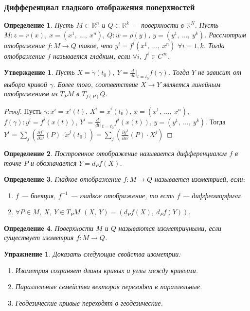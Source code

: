 \documentclass[12pt]{article}
\theoremstyle{plain}
\newtheorem{subtheorem}{Утверждение}[section]
\newtheorem*{exercise}{Упражнение}
\newtheorem{definition}{Определение}[section]
\newcommand{\R}{\mathbb R}
\begin{document}
    \subsubsection{Дифференциал гладкого отображения поверхностей}
    \begin{definition}
        Пусть $M\subset\R^n$ и $Q\subset\R^k$ --- поверхности в $\R^N$. Пусть $M:z=r(x)$, $x=(x^1, \ \ldots, \ x^n)$, $Q:w=\rho(y)$, $y=(y^1, \ \ldots, \ y^k)$. Рассмотрим отображение $f:M\to Q$ такое, что $y^i=f^i(x^1, \ \ldots, \ x^n)$ $\forall i=\overline{1,k}$. Тогда отображение $f$ называется гладким, если $\forall i$, $f^i\in C^{\infty}$.
    \end{definition}
    \begin{subtheorem}
        Пусть $X=\dot{\gamma}(t_0)$, $Y=\frac{d}{dt}|_{t=t_0}f(\gamma)$. Тогда $Y$ не зависит от выбора кривой $\gamma$. Более того, соответствие $X\longrightarrow Y$ является линейным отображением из $T_PM$ в $T_{f(P)}Q$.
    \end{subtheorem}
    \begin{proof}
        Пусть $\gamma:x^i=x^i(t)$, $X^i=\dot{x}^i(t_0)$, $x=(x^1, \ \ldots, \ x^n)$, $f(\gamma):y^i=f^i(x(t))$, $Y^i=\frac{d}{dt}|_{t=t_0}f^i(x(t))$, $y=(y^1, \ \ldots, \ y^k)$. Тогда $Y^i=\sum\limits_j\left(\frac{\partial f^i}{\partial x^j}(P)\cdot\dot{x}^j(t_0)\right)=\sum\limits_j\left(\frac{\partial f^i}{\partial x^j}(P)\cdot X^j\right)$
    \end{proof}
    \begin{definition}
        Построенное отображение называется дифференциалом $f$ в точке $P$ и обозначается $Y=d_Pf(X)$.
    \end{definition}
    \begin{definition}
        Гладкое отображение $f:M\to Q$ называется изометрией, если:
        \begin{enumerate}
            \item $f$ --- биекция, $f^{-1}$ --- гладкое отображение, то есть $f$ --- диффеоморфизм.
            \item $\forall P\in M$, $X$, $Y\in T_PM$ $(X, \ Y)=(d_Pf(X), \ d_Pf(Y))$.
        \end{enumerate}
    \end{definition}
    \begin{definition}
        Поверхности $M$ и $Q$ называются изометричными, если существует изометрия $f:M\to Q$.
    \end{definition}
    \begin{exercise}
        Доказать следующие свойства изометрии:
        \begin{enumerate}
            \item Изометрия сохраняет длины кривых и углы между кривыми.
            \item Параллельные семейства векторов переходят в параллельные.
            \item Геодезические кривые переходят в геодезические.
        \end{enumerate}
    \end{exercise}
\end{document}
